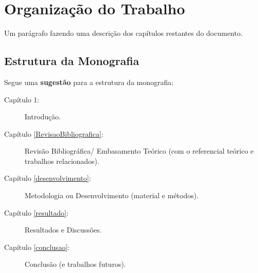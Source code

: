  


\section{Organização do Trabalho}

Um parágrafo fazendo uma descrição dos capítulos restantes do documento. 

\subsection{Estrutura da Monografia}

Segue uma \textbf{sugestão} para a estrutura da monografia: 

\begin{description}
   \item[Capítulo 1:] Introdução.
   \item[Capítulo \ref{RevisaoBibliografica}:] Revisão Bibliográfica/ Embasamento Teórico (com o referencial teórico e trabalhos relacionados).
   \item[Capítulo \ref{desenvolvimento}:] Metodologia ou Desenvolvimento (material e métodos).
   \item[Capítulo \ref{resultado}:] Resultados e Discussões.
   \item[Capítulo \ref{conclusao}:] Conclusão (e trabalhos futuros).
\end{description}


 









